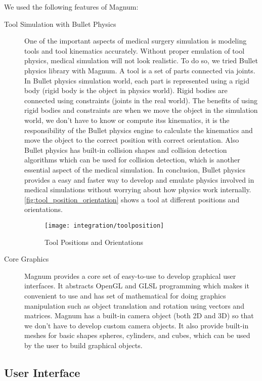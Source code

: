 We used the following features of Magnum:
\begin{description}
  \item [Tool Simulation with Bullet Physics] One of the important aspects of medical surgery simulation is modeling tools and tool kinematics accurately. Without proper emulation of tool physics, medical simulation will not look realistic. To do so, we tried Bullet physics library with Magnum. A tool is a set of parts connected via joints. In Bullet physics simulation world, each part is represented using a rigid body (rigid body is the object in physics world). Rigid bodies are connected using constraints (joints in the real world). The benefits of using rigid bodies and constraints are when we move the object in the simulation world, we don't have to know or compute itss kinematics, it is the responsibility of the Bullet physics engine to calculate the kinematics and move the object to the correct position with correct orientation. Also Bullet physics has built-in collision shapes and collision detection algorithms which can be used for collision detection, which is another essential aspect of the medical simulation. In conclusion, Bullet physics provides a easy and faster way to develop and emulate physics involved in medical simulations without worrying about how physics work internally. \autoref{fig:tool_position_orientation} shows a tool at different positions and orientations.

  \begin{figure}
    \centering
    \texttt{[image: integration/toolposition]}
    \caption{Tool Positions and Orientations}
    \label{fig:tool_position_orientation}
  \end{figure}

  \item [Core Graphics ] Magnum provides a core set of easy-to-use  to develop graphical user interfaces. It abstracts OpenGL and GLSL programming which makes it convenient to use and has set of mathematical  for doing graphics manipulation such as object translation and rotation using vectors and matrices. Magnum has a built-in camera object (both 2D and 3D) so that we don't have to develop custom camera objects. It also provide built-in meshes for basic shapes \ie spheres, cylinders, and cubes, which can be used by the user to build graphical objects.
\end{description}

\subsection{User Interface}
\label{sec:ui}

